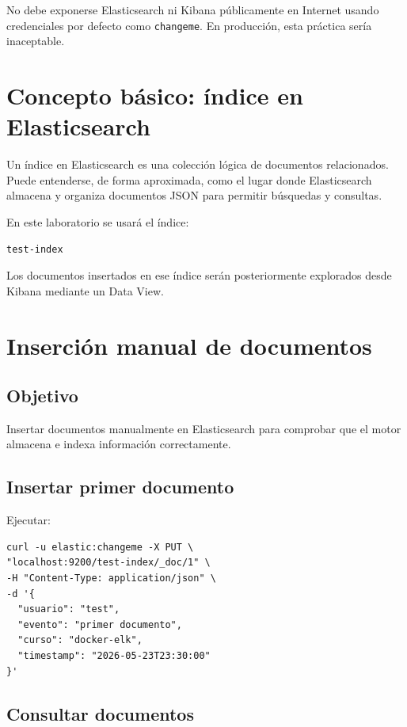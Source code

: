 \documentclass[
  coursetitle={Cómputo Nube y Tecnologías Emergentes},
  coursehours={96},
  coursedate={Verano 2026},
  doctype={Laboratorio},
  otherlangs={english,french},
  authorname={Lázaro},
  authorsurname={Bustio-Martínez},
  authortitle={PhD},
  role={Profesor Investigador},
  email={lbustio@inaoe.mx},
  phone={5559504000},
  ext={7459},
  institution={Instituto Nacional de Astrofísica, Óptica y Electrónica (INAOE)},
  department={Maestría en Ciencias en Tecnologías de Seguridad},
  address={Luis Enrique Erro 1, Sta. Ma. Tonantzintla, San Andrés Cholula, CP 72840, Puebla, México},
  margin={0.5in}
]{../../lbustio_lecture_notes}
\begin{document}
No debe exponerse Elasticsearch ni Kibana públicamente en Internet usando credenciales por defecto como \texttt{changeme}. En producción, esta práctica sería inaceptable.

\section{Concepto básico: índice en Elasticsearch}

Un índice en Elasticsearch es una colección lógica de documentos relacionados. Puede entenderse, de forma aproximada, como el lugar donde Elasticsearch almacena y organiza documentos JSON para permitir búsquedas y consultas.

En este laboratorio se usará el índice:

\begin{verbatim}
test-index
\end{verbatim}

Los documentos insertados en ese índice serán posteriormente explorados desde Kibana mediante un Data View.

\section{Inserción manual de documentos}

\subsection{Objetivo}

Insertar documentos manualmente en Elasticsearch para comprobar que el motor almacena e indexa información correctamente.

\subsection{Insertar primer documento}

Ejecutar:

\begin{lstlisting}
curl -u elastic:changeme -X PUT \
"localhost:9200/test-index/_doc/1" \
-H "Content-Type: application/json" \
-d '{
  "usuario": "test",
  "evento": "primer documento",
  "curso": "docker-elk",
  "timestamp": "2026-05-23T23:30:00"
}'
\end{lstlisting}

\subsection{Consultar documentos}
\end{document}
